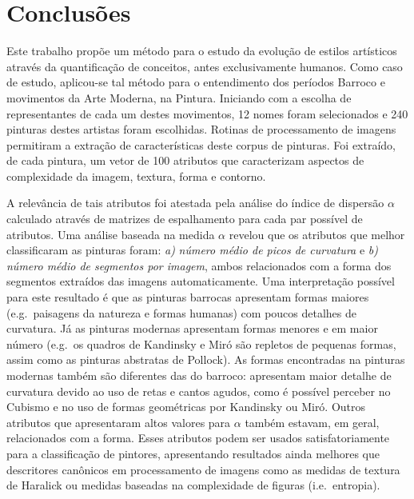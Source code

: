 
\chapter{Conclusões}
\label{chap:conclusoes}

Este trabalho propõe um método para o estudo da evolução de estilos
artísticos através da quantificação de conceitos, antes exclusivamente
humanos. Como caso de estudo, aplicou-se tal método para o entendimento
dos períodos Barroco e movimentos da Arte Moderna, na
Pintura. Iniciando com a escolha de representantes de cada um destes
movimentos, 12 nomes foram selecionados e 240 pinturas destes artistas foram
escolhidas. Rotinas de processamento de imagens permitiram a
extração de características deste corpus de pinturas. Foi extraído, de
cada pintura, um vetor de 100 atributos que caracterizam aspectos de
complexidade da imagem, textura, forma e contorno.  

A relevância de tais atributos foi atestada pela análise do índice de
dispersão $\alpha$ calculado através de matrizes de espalhamento para
cada par possível de atributos. Uma análise baseada na medida $\alpha$
revelou que os atributos que melhor classificaram as pinturas foram:
\textit{a)} \emph{número médio de picos de curvatura} e \textit{b)}
\emph{número médio de segmentos por imagem}, ambos relacionados com a
forma dos segmentos extraídos das imagens automaticamente. Uma
interpretação possível para este resultado é que as pinturas barrocas
apresentam formas maiores (e.g.\ paisagens da natureza e formas
humanas) com poucos detalhes de curvatura. Já as pinturas modernas
apresentam formas menores e em maior número (e.g.\ os quadros de
Kandinsky e Miró são repletos de pequenas formas, assim como as
pinturas abstratas de Pollock). As formas encontradas na pinturas
modernas também são diferentes das do barroco: apresentam maior
detalhe de curvatura devido ao uso de retas e cantos agudos, como é
possível perceber no Cubismo e no uso de formas geométricas por
Kandinsky ou Miró. Outros atributos que apresentaram altos valores para
$\alpha$ também estavam, em geral, relacionados com a forma. Esses
atributos podem ser usados satisfatoriamente para a classificação de
pintores, apresentando resultados ainda melhores que descritores
canônicos em processamento de imagens como as medidas de textura de
Haralick ou medidas baseadas na complexidade de figuras
(i.e.\ entropia).

